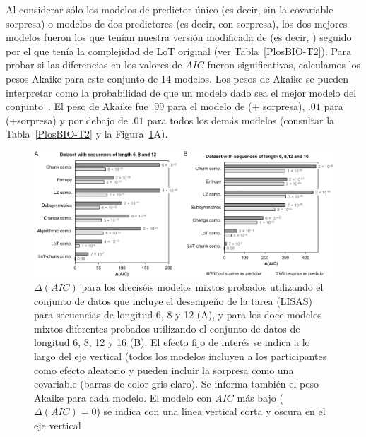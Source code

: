 Al considerar sólo los modelos de predictor único (es decir, sin la covariable sorpresa) o modelos de dos predictores (es decir, con sorpresa), los dos mejores modelos fueron los que tenían nuestra versión modificada de \mdlbin (es decir, \mdlbinfrag) seguido por el que tenía la complejidad de LoT original (ver Tabla~\ref{PlosBIO-T2}). Para probar si las diferencias en los valores de $AIC$ fueron significativas, calculamos los pesos Akaike para este conjunto de 14 modelos. Los pesos de Akaike se pueden interpretar como la probabilidad de que un modelo dado sea el mejor modelo del conjunto~\cite{f106}. El peso de Akaike fue $.99$ para el modelo de \mdlbinfrag (+ sorpresa), $.01$ para \mdlbin (+sorpresa) y por debajo de $.01$ para todos los demás modelos (consultar la Tabla~\ref{PlosBIO-T2} y la Figura~\ref{PlosBIO-F8}A).

\begin{figure}[t!]
   \includegraphics[scale=0.8]{figuras/plosbio/journal.pcbi.1008598.g008.PNG}
   
   \centering
   
   \caption{$\Delta(AIC)$ para los dieciséis modelos mixtos probados utilizando el conjunto de datos que incluye el desempeño de la tarea (LISAS) para secuencias de longitud 6, 8 y 12 (A), y para los doce modelos mixtos diferentes probados utilizando el conjunto de datos de longitud 6, 8, 12 y 16 (B). El efecto fijo de interés se indica a lo largo del eje vertical (todos los modelos incluyen a los participantes como efecto aleatorio y pueden incluir la sorpresa como una covariable (barras de color gris claro). Se informa también el peso Akaike para cada modelo. El modelo con $AIC$ más bajo ($\Delta (AIC) = 0$) se indica con una línea vertical corta y oscura en el eje vertical}
   \label{PlosBIO-F8}
\end{figure}

